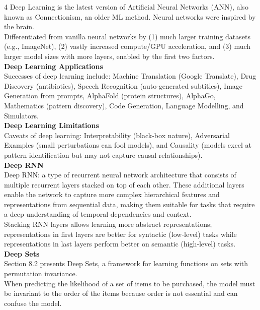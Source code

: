 \documentclass[8pt]{extarticle}
\begin{document}
\begin{multicols}{4}
Deep Learning is the latest version of Artificial Neural Networks (ANN), also known as Connectionism, an older ML method. Neural networks were inspired by the brain.\\
Differentiated from vanilla neural networks by (1) much larger training datasets (e.g., ImageNet), (2) vastly increased compute/GPU acceleration, and (3) much larger model sizes with more layers, enabled by the first two factors.\\
\vspace{2pt}\textbf{Deep Learning Applications}\\
Successes of deep learning include: Machine Translation (Google Translate), Drug Discovery (antibiotics), Speech Recognition (auto‑generated subtitles), Image Generation from prompts, AlphaFold (protein structures), AlphaGo, Mathematics (pattern discovery), Code Generation, Language Modelling, and Simulators.\\
\vspace{2pt}\textbf{Deep Learning Limitations}\\
Caveats of deep learning: Interpretability (black‑box nature), Adversarial Examples (small perturbations can fool models), and Causality (models excel at pattern identification but may not capture causal relationships).\\
\vspace{2pt}\textbf{Deep RNN}\\
Deep RNN: a type of recurrent neural network architecture that consists of multiple recurrent layers stacked on top of each other. These additional layers enable the network to capture more complex hierarchical features and representations from sequential data, making them suitable for tasks that require a deep understanding of temporal dependencies and context.\\
Stacking RNN layers allows learning more abstract representations; representations in first layers are better for syntactic (low‑level) tasks while representations in last layers perform better on semantic (high‑level) tasks.\\
\vspace{2pt}\textbf{Deep Sets}\\
Section 8.2 presents Deep Sets, a framework for learning functions on sets with permutation invariance.\\
When predicting the likelihood of a set of items to be purchased, the model must be invariant to the order of the items because order is not essential and can confuse the model.\\

\end{multicols}
\end{document}
